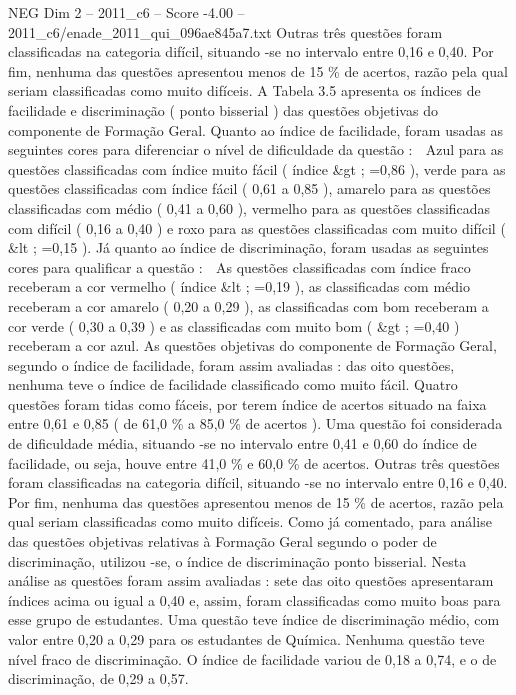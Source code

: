 \begin{textsample}{NEG Dim 2 – 2011\_c6 – Score -4.00 – 2011\_c6/enade\_2011\_qui\_096ae845a7.txt}
Outras três questões foram classificadas na categoria difícil, situando -se no intervalo entre 0,16 e 0,40.
Por fim, nenhuma das questões apresentou menos de 15 \% de acertos, razão pela qual seriam classificadas como muito difíceis.
A Tabela 3.5 apresenta os índices de facilidade e discriminação ( ponto bisserial ) das questões objetivas do componente de Formação Geral.
Quanto ao índice de facilidade, foram usadas as seguintes cores para diferenciar o nível de dificuldade da questão :  Azul para as questões classificadas com índice muito fácil ( índice \&gt ; =0,86 ), verde para as questões classificadas com índice fácil ( 0,61 a 0,85 ), amarelo para as questões classificadas com médio ( 0,41 a 0,60 ), vermelho para as questões classificadas com difícil ( 0,16 a 0,40 ) e roxo para as questões classificadas com muito difícil ( \&lt ; =0,15 ).
Já quanto ao índice de discriminação, foram usadas as seguintes cores para qualificar a questão :  As questões classificadas com índice fraco receberam a cor vermelho ( índice \&lt ; =0,19 ), as classificadas com médio receberam a cor amarelo ( 0,20 a 0,29 ), as classificadas com bom receberam a cor verde ( 0,30 a 0,39 ) e as classificadas com muito bom ( \&gt ; =0,40 ) receberam a cor azul.
As questões objetivas do componente de Formação Geral, segundo o índice de facilidade, foram assim avaliadas : das oito questões, nenhuma teve o índice de facilidade classificado como muito fácil.
Quatro questões foram tidas como fáceis, por terem índice de acertos situado na faixa entre 0,61 e 0,85 ( de 61,0 \% a 85,0 \% de acertos ).
Uma questão foi considerada de dificuldade média, situando -se no intervalo entre 0,41 e 0,60 do índice de facilidade, ou seja, houve entre 41,0 \% e 60,0 \% de acertos.
Outras três questões foram classificadas na categoria difícil, situando -se no intervalo entre 0,16 e 0,40.
Por fim, nenhuma das questões apresentou menos de 15 \% de acertos, razão pela qual seriam classificadas como muito difíceis.
Como já comentado, para análise das questões objetivas relativas à Formação Geral segundo o poder de discriminação, utilizou -se, o índice de discriminação ponto bisserial.
Nesta análise as questões foram assim avaliadas : sete das oito questões apresentaram índices acima ou igual a 0,40 e, assim, foram classificadas como muito boas para esse grupo de estudantes.
Uma questão teve índice de discriminação médio, com valor entre 0,20 a 0,29 para os estudantes de Química.
Nenhuma questão teve nível fraco de discriminação.
O índice de facilidade variou de 0,18 a 0,74, e o de discriminação, de 0,29 a 0,57.

\end{textsample}
